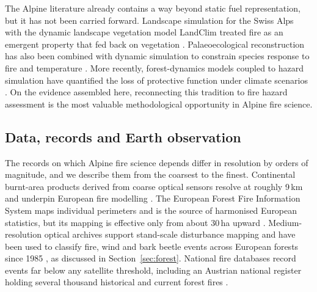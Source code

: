 \documentclass[11pt,a4paper]{article}
\begin{document}
The Alpine literature already contains a way beyond static fuel representation, but it has not been carried forward. Landscape simulation for the Swiss Alps with the dynamic landscape vegetation model LandClim treated fire as an emergent property that fed back on vegetation \citep{schumacher_relative_2006, colombaroli_species_2010}. Palaeoecological reconstruction has also been combined with dynamic simulation to constrain species response to fire and temperature \citep{colombaroli_species_2010}. More recently, forest-dynamics models coupled to hazard simulation have quantified the loss of protective function under climate scenarios \citep{hillebrand_contrasting_2023, moos_climate_2021}. On the evidence assembled here, reconnecting this tradition to fire hazard assessment is the most valuable methodological opportunity in Alpine fire science.

\subsection{Data, records and Earth observation}
\label{sec:data}

The records on which Alpine fire science depends differ in resolution by orders of magnitude, and we describe them from the coarsest to the finest. Continental burnt-area products derived from coarse optical sensors resolve at roughly 9\,km and underpin European fire modelling \citep{forrest_understanding_2024}. The European Forest Fire Information System maps individual perimeters and is the source of harmonised European statistics, but its mapping is effective only from about 30\,ha upward \citep{beloiu_climatedriven_2026}. Medium-resolution optical archives support stand-scale disturbance mapping and have been used to classify fire, wind and bark beetle events across European forests since 1985 \citep{miguel_unravelling_2026}, as discussed in Section~\ref{sec:forest}. National fire databases record events far below any satellite threshold, including an Austrian national register holding several thousand historical and current forest fires \citep{papathomakohle_towards_2025}.
\end{document}
